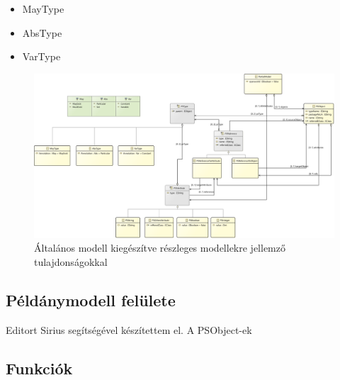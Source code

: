 \begin{itemize}  
	\item MayType
	\item AbsType
	\item VarType 
\end{itemize}

\begin{figure}[!ht]
	\centering
	\includegraphics[width=150mm]{figures/partialmodel02.pdf}
	\caption{Általános modell kiegészítve részleges modellekre jellemző tulajdonságokkal} 
\end{figure}



\subsection{Példánymodell felülete}
Editort Sirius segítségével készítettem el. A PSObject-ek 
\subsection{Funkciók}